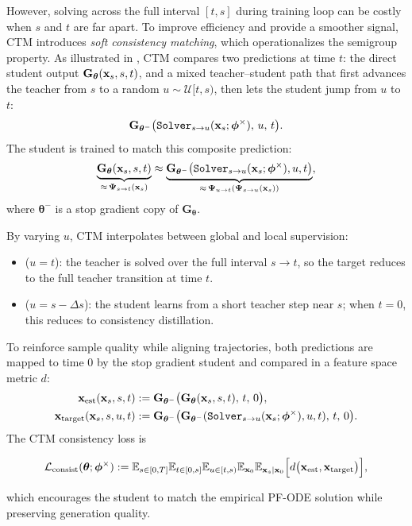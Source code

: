 However, solving across the full interval $[t,s]$ during training loop can be costly when $s$ and $t$ are far
apart. To improve efficiency and provide a smoother signal, CTM introduces
\emph{soft consistency matching}, which operationalizes the semigroup property.
As illustrated in , CTM compares two predictions at time
$t$: the direct student output $\mathbf{G}_{\bm{\theta}}({\mathbf{x}}_s, s, t)$, and a
mixed teacher–student path that first advances the teacher from $s$ to a random
$u \sim \mathcal{U}[t,s)$, then lets the student jump from $u$ to $t$:
\[
\mathbf{G}_{\bm{\theta}^-} \big(\mathtt{Solver}_{s\to u}({\mathbf{x}}_s;\bm{\phi}^\times),\, u,\, t\big).
\]
The student is trained to match this composite prediction:
\begin{align}\label{eq:soft}
\underbrace{\mathbf{G}_{\bm{\theta}}({\mathbf{x}}_s, s, t)}_{\approx\, {\bm{\Psi}}_{s\to t}({\mathbf{x}}_s)}
 \approx 
\underbrace{\mathbf{G}_{\bm{\theta}^-} \big(\mathtt{Solver}_{s\to u}({\mathbf{x}}_s;\bm{\phi}^\times), u, t\big)}_{\approx\, {\bm{\Psi}}_{u\to t}({\bm{\Psi}}_{s\to u}({\mathbf{x}}_s))},
\end{align}
where $\bm{\theta}^-$ is a stop gradient copy of $\mathbf{G}_{\bm{\theta}}$.

By varying $u$, CTM interpolates between global and local supervision:
\begin{itemize}
    \item {} ($u=t$): the teacher is solved over the
    full interval $s\to t$, so the target reduces to the full teacher
    transition at time $t$.

    \item {} ($u=s-\Delta s$): the student learns
    from a short teacher step near $s$; when $t=0$, this reduces to consistency
    distillation.
\end{itemize}

To reinforce sample quality while aligning trajectories, both predictions are
mapped to time $0$ by the stop gradient student and compared in a feature
space metric $d$:
\begin{align*}
{\mathbf{x}}_{\mathrm{est}}({\mathbf{x}}_s,s,t) &:= \mathbf{G}_{\bm{\theta}^-} \big(\mathbf{G}_{\bm{\theta}}({\mathbf{x}}_s,s,t),\, t,\, 0\big),\\
{\mathbf{x}}_{\mathrm{target}}({\mathbf{x}}_s,s,u,t) &:= \mathbf{G}_{\bm{\theta}^-} \big(
\mathbf{G}_{\bm{\theta}^-}(\mathtt{Solver}_{s\to u}({\mathbf{x}}_s;\bm{\phi}^\times), u, t),\, t,\, 0\big).
\end{align*}
The CTM consistency loss is
\begin{mdframed}
    \begin{align}\label{eq:ctm-consist-distill}
\begin{aligned}
\mathcal{L}_{\mathrm{consist}}(\bm{\theta}; \bm{\phi}^\times)
:=
\mathbb{E}_{s \in [0,T]}\mathbb{E}_{t \in [0,s]}\mathbb{E}_{u \in [t,s)}
\mathbb{E}_{{\mathbf{x}}_0}\mathbb{E}_{{\mathbf{x}}_s |{\mathbf{x}}_0}
\Big[ d\big({\mathbf{x}}_{\mathrm{est}}, {\mathbf{x}}_{\mathrm{target}}\big) \Big],
\end{aligned}
\end{align}
\end{mdframed}
which encourages the student to match the empirical PF-ODE solution while
preserving generation quality.


